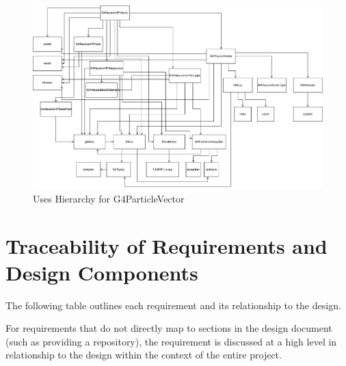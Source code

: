 \documentclass[12pt]{article}
\newcommand{\todo}[1]{\textcolor{red}{[TODO: #1]}} \else
\newcommand{\authornote}[3]{} \newcommand{\todo}[1]{} \fi
\newcommand{\ds}[1]{\authornote{blue}{DS}{#1}}
\newcommand{\mmp}[1]{\authornote{green}{MP}{#1}}
\begin{document}
\begin{figure}[h]
\caption{Uses Hierarchy for G4ParticleVector}\label{imgUsesHierarchy}
\includegraphics[width=\textwidth]{uses_hierarchy.pdf}
\end{figure}
\FloatBarrier

\ds{Hard to read.} \mmp{sorry}

\section{Traceability of Requirements and Design Components}%
The following table outlines each requirement and its relationship to the design.

For requirements that do not directly map to sections in the design document (such as providing a repository), the requirement is discussed at a high level in relationship to the design within the context of the entire project.
\end{document}
